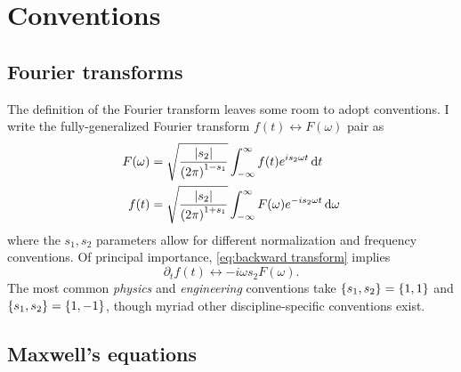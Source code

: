 \chapter{Conventions}

\section{Fourier transforms\label{sec:general transform}}

The definition of the Fourier transform leaves some room to adopt conventions.
I write the fully-generalized Fourier transform $f(t) \leftrightarrow F(\omega)$ pair as
\begin{subequations}
  \begin{align}
    F(\omega) &= \sqrt{\frac{\abs{s_2}}{\qty(2\pi)^{1-s_1}}} \int_{-\infty}^{\infty} f(t) e^{i s_2 \omega t} \dd{t} \label{eq:forward transform} \\
    f(t) &= \sqrt{\frac{\abs{s_2}}{\qty(2\pi)^{1+s_1}}} \int_{-\infty}^{\infty} F(\omega) e^{- i s_2 \omega t} \dd{\omega} \label{eq:backward transform}
  \end{align}
\end{subequations}
where the $s_1, s_2$ parameters allow for different normalization and frequency conventions.
Of principal importance, \cref{eq:backward transform} implies
\begin{equation}
  \partial_t f(t) \leftrightarrow -i \omega s_2 F(\omega).
\end{equation}
The most common \emph{physics} and \emph{engineering} conventions take $\qty{s_1, s_2} = \qty{1, 1}$ and $\qty{s_1, s_2} = \qty{1, -1}$, though myriad other discipline-specific conventions exist.

\section{\label{appendix:maxwell}Maxwell's equations}

